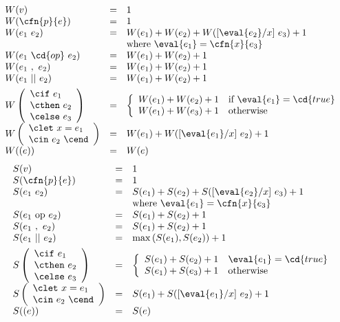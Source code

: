 \begin{definition}
\[
\begin{array}{lcl}
W(v) & = & 1 
\\
W(\cfn{p}{e})  & = & 1 
\\
  W(e_1~e_2) & =  & W(e_1) + W(e_2) + W([\eval{e_2}/x]~e_3) + 1 
\\
          &    & \mbox{where}~\eval{e_1} = \cfn{x}{e_3}
\\
W(e_1~\cd{op}~e_2) & = &  W(e_1) + W(e_2) + 1
\\
W(e_1~,~e_2) & = & W(e_1) + W(e_2) + 1
\\
W(e_1~||~e_2) &=& W(e_1) + W(e_2) + 1
\\[1ex]
W\left(
\begin{array}{l}
\cif~e_1
\\
\cthen~e_2
\\
\celse~e_3
\end{array}
\right)  
& = & 
\left\{
\begin{array}{ll}
W(e_1) + W(e_2) + 1 & \mbox{if}~\eval{e_1} = \cd{true}
\\
W(e_1) + W(e_3) + 1 & \mbox{otherwise}
\end{array}\right.
\\[1ex]
W\left(
\begin{array}{l}
\clet~x=e_1~
\\
\cin~e_2~\cend
\end{array}
\right) 
& = & W(e_1) + W([\eval{e_1}/x]~e_2) + 1
\\[1ex]
W( ( e ) ) & = & W(e)
\end{array}
\]
%
\medskip
%
\[
\begin{array}{lcl}
S(v) & = & 1 
\\
S(\cfn{p}{e})  & = & 1 
\\
S(e_1~e_2) & =  & S(e_1) + S(e_2) + S([\eval{e_2}/x]~e_3) + 1 
\\
          &    & \mbox{where}~\eval{e_1} = \cfn{x}{e_3}
\\
S(e_1~\mbox{op}~e_2) & = &  S(e_1) + S(e_2) + 1
\\
S(e_1~,~e_2) & = & S(e_1) + S(e_2) + 1
\\
S(e_1~||~e_2) &=& \max{}{(S(e_1),S(e_2))} + 1
\\[1ex]
S\left(
\begin{array}{l}
\cif~e_1
\\
\cthen~e_2
\\
\celse~e_3
\end{array}
\right)
& = & 
\left\{
\begin{array}{ll}
S(e_1) + S(e_2) + 1 & \eval{e_1} = \cd{true}\\
S(e_1) + S(e_3) + 1 & \mbox{otherwise}
\end{array}\right.
\\[1ex]
S\left(
\begin{array}{l}
\clet~x=e_1~
\\
\cin~e_2~\cend
\end{array}
\right) 
& = & S(e_1) + S([\eval{e_1}/x]~e_2) + 1
\\[1ex]
S( ( e ) ) & = & S(e)
\\
\end{array}
\]


\end{definition}
